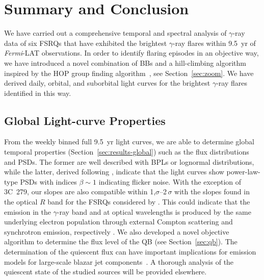 \documentclass[twocolumn]{aastex62}
\newcommand{\gray}{$\gamma$-ray\xspace}
\newcommand{\fermiLAT}{\emph{Fermi}-LAT\xspace}
\begin{document}
\section{Summary and Conclusion}
\label{sec:conclusion}

We have carried out a comprehensive temporal and spectral analysis of  \gray data of six FSRQs that have exhibited the brightest \gray flares within 9.5~yr of \fermiLAT observations.
In order to identify flaring episodes in an objective way, we have introduced a novel combination of BBs \citep[][]{2013ApJ...764..167S} and a hill-climbing algorithm inspired by the HOP group finding algorithm~\citep{1998ApJ...498..137E}, see Section~\ref{sec:zoom}.
We have derived daily, orbital, and suborbital light curves for the brightest \gray flares identified in this way.

\subsection{Global Light-curve Properties}
From the weekly binned full 9.5~yr light curves, we are able to determine global temporal properties (Section~\ref{sec:results-global}) such as the flux distributions and PSDs. 
The former are well described with BPLs or lognormal distributions, while the latter, derived following \citet{2014MNRAS.445..437M}, indicate that the light curves show power-law-type PSDs with indices $\beta\sim 1$ indicating flicker noise.
With the exception of 3C~279, our slopes are also compatible within 1,$\sigma$--2\,$\sigma$ with the slopes found in the optical $R$ band for the FSRQs considered by \citet[][3C~273, 3C~279, PKS~1510-089, 3C~454.3]{2012ApJ...749..191C}. 
This could indicate that the emission in the \gray band and at optical wavelengths is produced by the same underlying electron population through external Compton scattering and synchrotron emission, respectively \citep{2014ApJ...791...21F,2015ApJ...809...85F}.  
We also developed a novel objective algorithm to determine the flux level of the QB (see Section~\ref{sec:qb}).
The determination of the quiescent flux can have important implications for emission models for large-scale blazar jet components~\citep{2014ApJ...780L..27M}.
A thorough analysis of the quiescent state of the studied sources will be provided elsewhere. 
\end{document}
